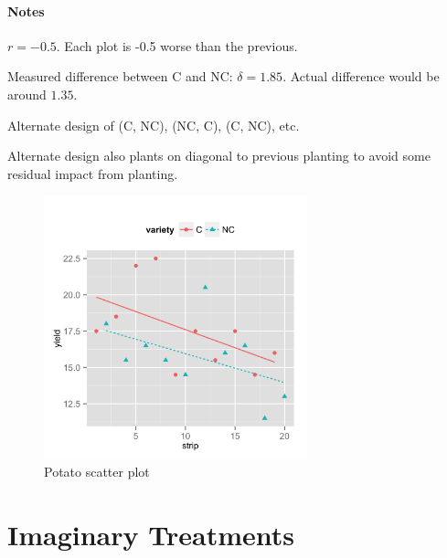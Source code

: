 \documentclass[landscape]{article}
\begin{document}
\begin{note}
  \paragraph{Notes}
  \begin{itemize*}
    \item $r = -0.5$. Each plot is -0.5 worse than the previous.
    \item Measured difference between C and NC\@: $\delta = 1.85$. Actual
      difference would be around $1.35$.
    \item Alternate design of (C, NC), (NC, C), (C, NC), etc. 
    \item Alternate design also plants on diagonal to previous planting to avoid
      some residual impact from planting.
  \end{itemize*}
\end{note}
  
  \begin{figure}[H]
    \centering
    \includegraphics[width = 3in, height = 3in]{potatoes.png}
    \caption{Potato scatter plot}\label{fig:potatoes}
  \end{figure}

  \newpage

  \section{Imaginary Treatments} %
\end{document}
